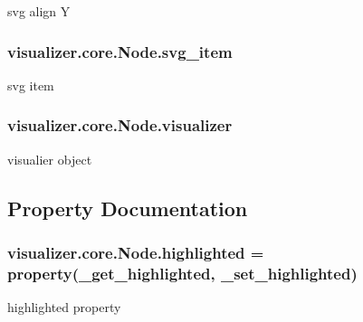 svg align Y 

\subsubsection[{\texorpdfstring{svg\+\_\+item}{svg_item}}]{\setlength{\rightskip}{0pt plus 5cm}visualizer.\+core.\+Node.\+svg\+\_\+item}\hypertarget{classvisualizer_1_1core_1_1Node_a8fc37475251336b56578ff3a5d437ba3}{}\label{classvisualizer_1_1core_1_1Node_a8fc37475251336b56578ff3a5d437ba3}


svg item 

\subsubsection[{\texorpdfstring{visualizer}{visualizer}}]{\setlength{\rightskip}{0pt plus 5cm}visualizer.\+core.\+Node.\+visualizer}\hypertarget{classvisualizer_1_1core_1_1Node_a0a496e48f933bd1b1abb6bfaf0c35697}{}\label{classvisualizer_1_1core_1_1Node_a0a496e48f933bd1b1abb6bfaf0c35697}


visualier object 



\subsection{Property Documentation}
\subsubsection[{\texorpdfstring{highlighted}{highlighted}}]{\setlength{\rightskip}{0pt plus 5cm}visualizer.\+core.\+Node.\+highlighted = property({\bf \+\_\+get\+\_\+highlighted}, {\bf \+\_\+set\+\_\+highlighted})\hspace{0.3cm}{\ttfamily [static]}}\hypertarget{classvisualizer_1_1core_1_1Node_a4bf6c669466a274f80bb1ac72b6c067a}{}\label{classvisualizer_1_1core_1_1Node_a4bf6c669466a274f80bb1ac72b6c067a}


highlighted property 

